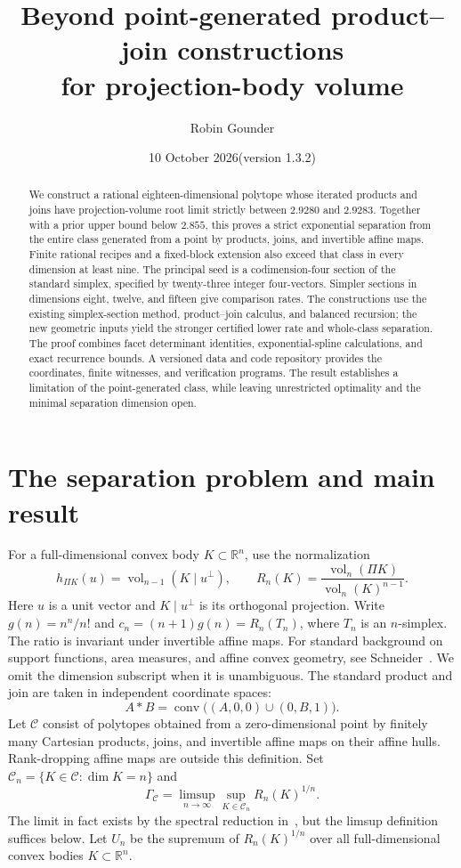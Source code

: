 \documentclass[11pt]{article}
\title{Beyond point-generated product--join constructions\protect\\for projection-body volume}
\author{Robin Gounder}
\date{10 October 2026\quad\textnormal{(version 1.3.2)}}
\DeclareMathOperator{\vol}{vol}
\DeclareMathOperator{\conv}{conv}
\newcommand{\R}{\mathbb R}
\newcommand{\CC}{\mathcal C}
\begin{document}
\maketitle
\begin{abstract}
We construct a rational eighteen-dimensional polytope whose iterated
products and joins have projection-volume root limit strictly between
$2.9280$ and $2.9283$. Together with a prior upper bound below $2.855$,
this proves a strict exponential separation from the entire class
generated from a point by products, joins, and invertible affine maps.
Finite rational recipes and a fixed-block extension also exceed that
class in every dimension at least nine. The principal seed is a
codimension-four section of the standard simplex, specified by twenty-three
integer four-vectors. Simpler sections in dimensions eight, twelve, and
fifteen give comparison rates. The constructions use the existing
simplex-section method, product--join calculus, and balanced recursion;
the new geometric inputs yield the stronger certified lower rate and
whole-class separation. The proof combines facet determinant identities,
exponential-spline calculations, and exact recurrence bounds. A versioned
data and code repository provides the coordinates, finite witnesses, and
verification programs. The result establishes a limitation of the
point-generated class, while leaving unrestricted optimality and the
minimal separation dimension open.
\end{abstract}

\section{The separation problem and main result}
For a full-dimensional convex body $K\subset\R^n$, use the normalization
\[
 h_{\Pi K}(u)=\vol_{n-1}(K\mid u^\perp),\qquad
 R_n(K)=\frac{\vol_n(\Pi K)}{\vol_n(K)^{n-1}}.
\]
Here $u$ is a unit vector and $K\mid u^\perp$ is its orthogonal projection.
Write $g(n)=n^n/n!$ and $c_n=(n+1)g(n)=R_n(T_n)$, where $T_n$ is an
$n$-simplex. The ratio is invariant under invertible affine maps.
For standard background on support functions, area measures, and affine
convex geometry, see Schneider~\cite{schneider}.
We omit the dimension subscript when it is unambiguous.
The standard product and join are taken in independent coordinate spaces:
\[
 A*B=\conv\bigl((A,0,0)\cup(0,B,1)\bigr).
\]
Let $\CC$ consist of polytopes obtained from a zero-dimensional point by
finitely many Cartesian products, joins, and invertible affine maps on
their affine hulls. Rank-dropping affine maps are outside this definition.
Set $\CC_n=\{K\in\CC:\dim K=n\}$ and
\[
 \Gamma_{\CC}=\limsup_{n\to\infty}\sup_{K\in\CC_n}R_n(K)^{1/n}.
\]
The limit in fact exists by the spectral reduction in~\cite{mxym-spectral},
but the limsup definition suffices below.
Let $U_n$ be the supremum of $R_n(K)^{1/n}$ over all full-dimensional
convex bodies $K\subset\R^n$.
\end{document}
